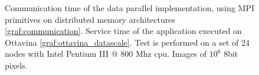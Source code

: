 \begin{figure}[p]
\centering
{}
\caption{ Communication time of the data parallel implementation, using MPI primitives on distributed memory architectures \ref{graf:communication}. Service time of the application executed on Ottavina \ref{graf:ottavina_datascale}.  Test is performed on a set of 24 nodes with Intel Pentium III @ 800 Mhz cpu. Images of $10^6$ 8bit pixels.}
\label{chart:pianosa_comm}
\end{figure}

